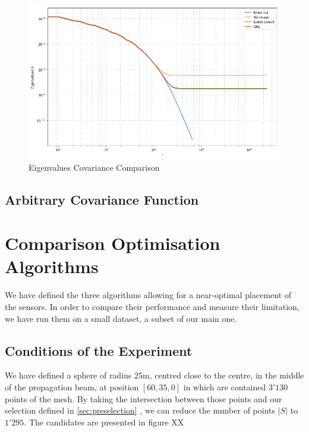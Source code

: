 \begin{figure}[h!]
\centering
    \includegraphics[width=0.8\linewidth]{figures/Covariance/Tracer_23643/cov_all_eigenval_loglog_zoom}
    \caption{Eigenvalues Covariance Comparison}
    \label{fig:cov:comparison:eigs}
\end{figure}



\subsection{Arbitrary Covariance Function}







\section{Comparison Optimisation Algorithms}

We have defined the three algorithms allowing for a near-optimal placement of the sensors. In order to compare their performance and measure their limitation, we have run them on a small dataset, a subset of our main one. 
\subsection{Conditions of the Experiment}

We have defined a sphere of radius $25$m, centred close to the centre, in the middle of the propagation beam, at position $[60,35,0]$ in which are contained $3'130$ points of the mesh. By taking the intersection between those points and our selection defined in \ref{sec:preselection} , we can reduce the number of points $|S|$ to $1'295$.  The candidates are presented in figure  XX \\


